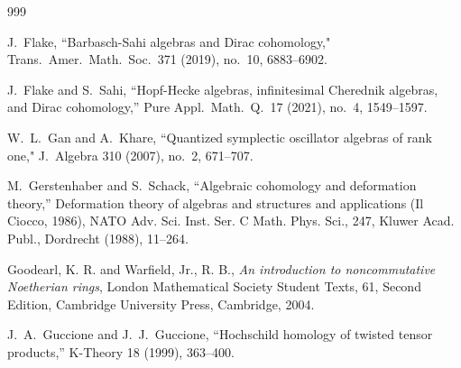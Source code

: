 \documentclass[11pt]{amsart}
\numberwithin{equation}{section}
\renewcommand{\_}[1]{\mbox{$_{\left( #1 \right)}$}}
\begin{document}
{\begin{thebibliography}{999}


J.~Flake, ``Barbasch-Sahi algebras and Dirac cohomology,"
Trans.~Amer.~Math.~Soc.~371 (2019), no.~10, 6883--6902. 

J.~Flake and S.~Sahi,
``Hopf-Hecke algebras, infinitesimal Cherednik algebras, and Dirac cohomology,''
Pure Appl.~Math.~Q.~17 (2021), no.~4, 1549--1597.

W.~L.~Gan and A.~Khare, ``Quantized symplectic oscillator algebras
of rank one," J.~Algebra 310 (2007), no.~2, 671--707. 
  
    M.\ Gerstenhaber and S.\ Schack,
``Algebraic cohomology and deformation theory,'' 
Deformation theory of algebras and structures and applications
      (Il Ciocco, 1986),
NATO Adv. Sci. Inst. Ser. C Math. Phys. Sci., 247,
Kluwer Acad. Publ., Dordrecht (1988), 11--264.
  
  Goodearl, K. R. and Warfield, Jr., R. B.,
{\em An introduction to noncommutative {N}oetherian rings},
 London Mathematical Society Student Texts,
 61, Second Edition,
Cambridge University Press, Cambridge, 2004.


 


  J.\ A.\ Guccione and J.\ J.\ Guccione, 
``Hochschild homology of twisted tensor products,''
K-Theory 18 (1999), 363--400. 


  

\end{thebibliography}}
\end{document}
